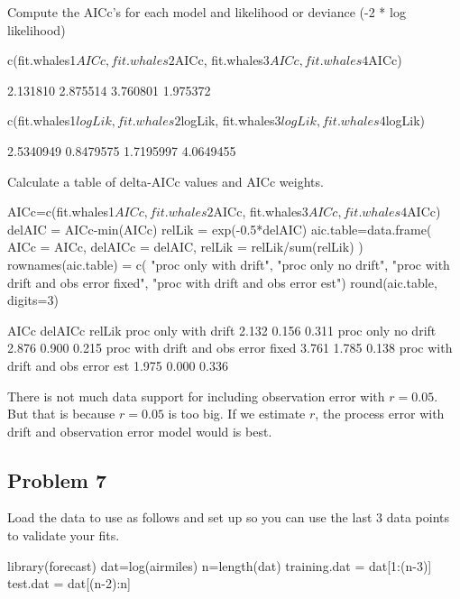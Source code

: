 \begin{wideenumerate}
\item Compute the AICc's for each model and likelihood or deviance (-2 * log likelihood)
\begin{Schunk}
\begin{Sinput}
 c(fit.whales1$AICc, fit.whales2$AICc, 
   fit.whales3$AICc, fit.whales4$AICc)
\end{Sinput}
\begin{Soutput}
[1] 2.131810 2.875514 3.760801 1.975372
\end{Soutput}
\begin{Sinput}
 c(fit.whales1$logLik, fit.whales2$logLik, 
   fit.whales3$logLik, fit.whales4$logLik)
\end{Sinput}
\begin{Soutput}
[1] 2.5340949 0.8479575 1.7195997 4.0649455
\end{Soutput}
\end{Schunk}

\item Calculate a table of delta-AICc values and AICc weights. 
\begin{Schunk}
\begin{Sinput}
 AICc=c(fit.whales1$AICc, fit.whales2$AICc, 
        fit.whales3$AICc, fit.whales4$AICc)
 delAIC = AICc-min(AICc)
 relLik = exp(-0.5*delAIC)
 aic.table=data.frame(
   AICc = AICc,
   delAICc = delAIC,
   relLik = relLik/sum(relLik)
 )
 rownames(aic.table) = c(
   "proc only with drift", 
   "proc only no drift", 
   "proc with drift and obs error fixed",
   "proc with drift and obs error est")
 round(aic.table, digits=3)
\end{Sinput}
\begin{Soutput}
                                     AICc delAICc relLik
proc only with drift                2.132   0.156  0.311
proc only no drift                  2.876   0.900  0.215
proc with drift and obs error fixed 3.761   1.785  0.138
proc with drift and obs error est   1.975   0.000  0.336
\end{Soutput}
\end{Schunk}
There is not much data support for including observation error with $r=0.05$.  But that is because $r=0.05$ is too big.  If we estimate $r$, the process error with drift and observation error model would is best.
\end{wideenumerate}

\subsection*{Problem 7}
Load the data to use as follows and set up so you can use the last 3 data points to validate your fits. 
\begin{Schunk}
\begin{Sinput}
 library(forecast)
 dat=log(airmiles)
 n=length(dat)
 training.dat = dat[1:(n-3)]
 test.dat = dat[(n-2):n]
\end{Sinput}
\end{Schunk}

